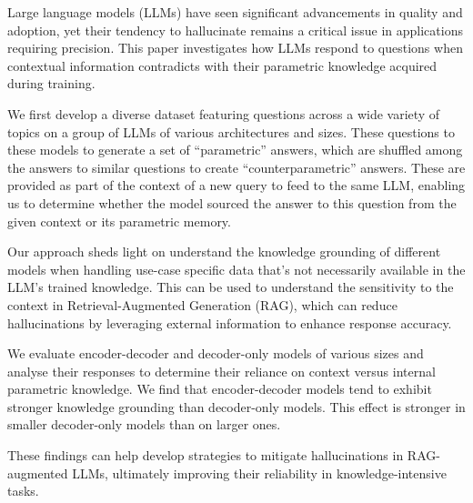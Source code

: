 Large language models (LLMs) have seen significant advancements in quality and adoption, yet their tendency to hallucinate remains a critical issue in applications requiring precision.
This paper investigates how LLMs respond to questions when contextual information contradicts with their parametric knowledge acquired during training.

We first develop a diverse dataset featuring questions across a wide variety of topics on a group of LLMs of various architectures and sizes.
These questions to these models to generate a set of ``parametric'' answers, which are shuffled among the answers to similar questions to create ``counterparametric'' answers.
These are provided as part of the context of a new query to feed to the same LLM, enabling us to determine whether the model sourced the answer to this question from the given context or its parametric memory.

Our approach sheds light on understand the knowledge grounding of different models when handling use-case specific data that's not necessarily available in the LLM's trained knowledge.
This can be used to understand the sensitivity to the context in Retrieval-Augmented Generation (RAG), which can reduce hallucinations by leveraging external information to enhance response accuracy.

We evaluate encoder-decoder and decoder-only models of various sizes and analyse their responses to determine their reliance on context versus internal parametric knowledge.
We find that encoder-decoder models tend to exhibit stronger knowledge grounding than decoder-only models.
This effect is stronger in smaller decoder-only models than on larger ones.

These findings can help develop strategies to mitigate hallucinations in RAG-augmented LLMs, ultimately improving their reliability in knowledge-intensive tasks.
